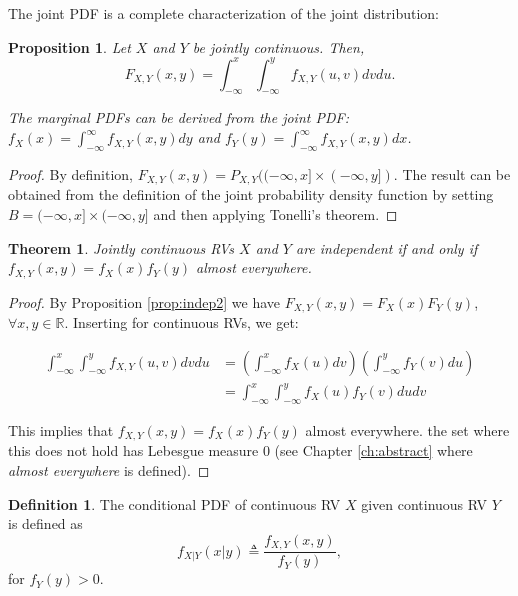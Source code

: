 \documentclass{book}
\theoremstyle{plain}%
\newtheorem{theorem}{Theorem}[section]
\newtheorem{proposition}{Proposition}[section]
\theoremstyle{definition}
\newtheorem{definition}{Definition}[section]
\begin{document}
The joint PDF is a complete characterization of the joint distribution:

\begin{proposition}
Let $X$ and $Y$ be jointly continuous. Then,
$$F_{X,Y}(x,y) = \int_{-\infty}^x \int_{-\infty}^y f_{X,Y}(u,v)dvdu.$$

The marginal PDFs can be derived from the joint PDF: $f_X(x) = \int_{-\infty}^\infty f_{X,Y}(x,y)dy$ and $f_Y(y) = \int_{-\infty}^\infty f_{X,Y}(x,y)dx$.
\end{proposition}

\begin{proof}
 By definition, $F_{X,Y}(x,y) = P_{X,Y}((-\infty, x] \times (-\infty, y])$. The result can be obtained from the definition of the joint probability density function by setting $B = (-\infty, x] \times (-\infty, y]$ and then applying Tonelli's theorem.
\end{proof}

\begin{theorem}
Jointly continuous RVs $X$ and $Y$ are independent if and only if $f_{X,Y}(x,y) = f_X(x)f_Y(y)$ almost everywhere.
\end{theorem}

\begin{proof}
By Proposition \ref{prop:indep2} we have $F_{X,Y}(x,y) = F_X(x)F_Y(y)$, $\forall x,y \in \mathbb{R}$. Inserting for continuous RVs, we get:

\begin{align*}
\int_{-\infty}^x \int_{-\infty}^y f_{X,Y}(u,v)dv du &= \left(\int_{-\infty}^x f_{X}(u)dv\right)\left( \int_{-\infty}^y f_{Y}(v)du\right)\\
&= \int_{-\infty}^x \int_{-\infty}^y f_{X}(u) f_{Y}(v)du dv
\end{align*}

This implies that $f_{X,Y}(x,y) = f_{X}(x)f_{Y}(y)$ almost everywhere. the set where this does not hold has Lebesgue measure 0 (see Chapter \ref{ch:abstract} where \emph{almost everywhere} is defined).
\end{proof}

\begin{definition}
The conditional PDF of continuous RV $X$ given continuous RV $Y$ is defined as
$$f_{X|Y}(x|y) \triangleq \frac{f_{X,Y}(x,y)}{f_Y(y)},$$
for $f_Y(y) > 0$.
\end{definition}

\end{document}
